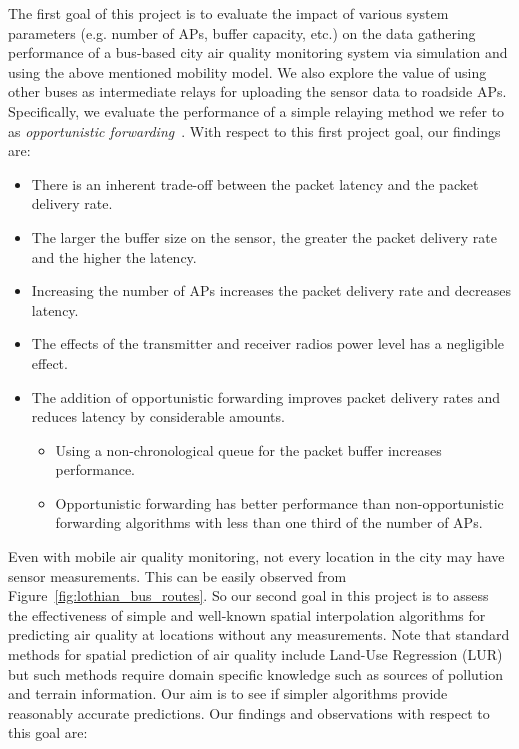 
    The first goal of this project is to evaluate the impact of various system parameters (e.g. number of APs, buffer capacity, etc.) on the data gathering performance of a bus-based city air quality monitoring system via simulation and using the above mentioned mobility model. We also explore the value of using other buses as intermediate relays for uploading the sensor data to roadside APs. Specifically, we evaluate the performance of a simple relaying method we refer to as \emph{opportunistic forwarding}~\cite{opportunisticforwarding}. With respect to this first project goal, our findings are: 

    \begin{itemize}
        \item There is an inherent trade-off between the packet latency and the packet delivery rate.
        \item The larger the buffer size on the sensor, the greater the packet delivery rate and the higher the latency.
        \item Increasing the number of APs increases the packet delivery rate and decreases latency.
        \item The effects of the transmitter and receiver radios power level has a negligible effect.
        \item The addition of opportunistic forwarding improves packet delivery rates and reduces latency by considerable amounts.
        \begin{itemize}
            \item Using a non-chronological queue for the packet buffer increases performance.
            \item Opportunistic forwarding has better performance than non-opportunistic forwarding algorithms with less than one third of the number of APs.
        \end{itemize}
    \end{itemize}


    Even with mobile air quality monitoring, not every location in the city may have sensor measurements. This can be easily observed from Figure~\ref{fig:lothian_bus_routes}. So our second goal in this project is to assess the effectiveness of simple and well-known spatial interpolation algorithms for predicting air quality at locations without any measurements. Note that standard methods for spatial prediction of air quality include Land-Use Regression (LUR) but such methods require domain specific knowledge such as sources of pollution and terrain information. Our aim is to see if simpler algorithms provide reasonably accurate predictions. Our findings and observations with respect to this goal are:

